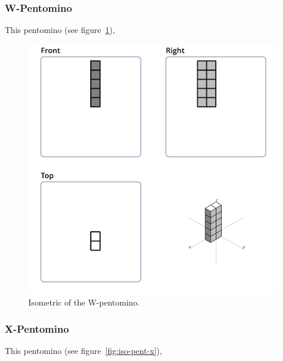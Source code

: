 \subsubsection{W-Pentomino}
\label{sec:w-pentomino}
This pentomino (see figure~\ref{fig:iso-pent-w}),


\begin{figure}
	\centering
	\includegraphics[scale=0.3]{iso_diagrams/o.png}
	\caption{Isometric of the W-pentomino.}
  \label{fig:iso-pent-w}
\end{figure}
\subsubsection{X-Pentomino}
\label{sec:x-pentomino}
This pentomino (see figure~\ref{fig:iso-pent-x}),


